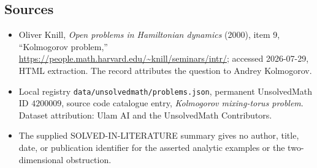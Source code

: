 \documentclass[11pt]{article}
\begin{document}
\subsection{Sources}
\begin{itemize}
\item Oliver Knill, \emph{Open problems in Hamiltonian dynamics} (2000), item 9, ``Kolmogorov problem,'' \url{https://people.math.harvard.edu/~knill/seminars/intr/}; accessed 2026-07-29, HTML extraction. The record attributes the question to Andrey Kolmogorov.
\item Local registry \texttt{data/unsolvedmath/problems.json}, permanent UnsolvedMath ID $4200009$, source code catalogue entry, \emph{Kolmogorov mixing-torus problem}. Dataset attribution: Ulam AI and the UnsolvedMath Contributors.
\item The supplied SOLVED-IN-LITERATURE summary gives no author, title, date, or publication identifier for the asserted analytic examples or the two-dimensional obstruction.
\end{itemize}
\end{document}
